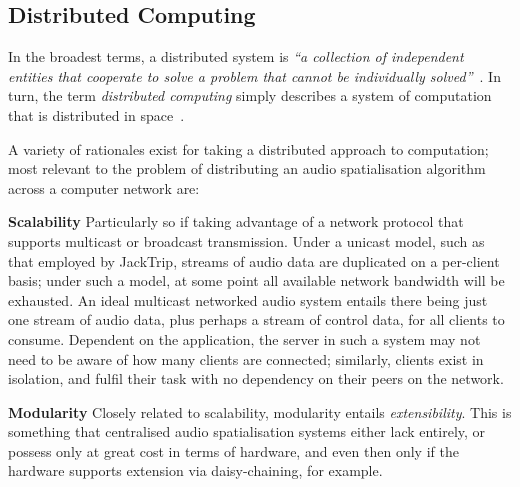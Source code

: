 \subsection{Distributed Computing}\label{subsec:distributed-computing}

In the broadest terms, a distributed system is \textit{``a collection of
independent entities that cooperate to solve a problem that cannot be
individually solved''}~\citep{kshemkalyani_distributed_2011}.
In turn, the term \textit{distributed computing} simply describes a system of
computation that is distributed in
space~\citep{lamport_distributed_1990}.%

A variety of rationales exist for taking a distributed approach to
computation;
most relevant to the problem of distributing an audio spatialisation algorithm
across a computer network are:

\textbf{Scalability}
Particularly so if taking advantage of a network protocol that supports
multicast or broadcast transmission.
Under a unicast model, such as that employed by JackTrip, streams of audio data
are duplicated on a per-client basis;
under such a model, at some point all available network bandwidth will be
exhausted.
An ideal multicast networked audio system entails there being just one stream
of audio data, plus perhaps a stream of control data, for all clients to
consume.
Dependent on the application, the server in such a system may not need to be
aware of how many clients are connected; similarly, clients exist in isolation,
and fulfil their task with no dependency on their peers on the network.

\textbf{Modularity}
Closely related to scalability, modularity entails \textit{extensibility}.
This is something that centralised audio spatialisation systems either lack
entirely, or possess only at great cost in terms of hardware, and even then only
if the hardware supports extension via daisy-chaining, for example.

